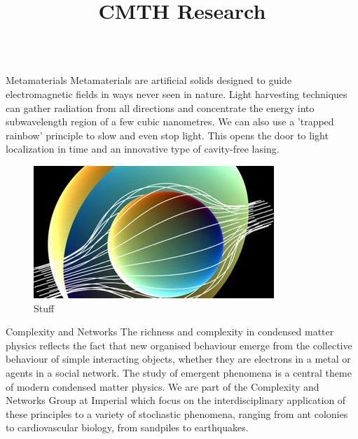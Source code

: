 \documentclass[xcolor={table}]{beamer}
\title{CMTH Research}
\begin{document}
\small
\begin{frame}[fragile=singleslide,t]\centering

\maketitle

\begin{columns}[onlytextwidth,T]

\begin{column}{.47\textwidth}

\begin{block}{Metamaterials}
Metamaterials are artificial solids designed to guide electromagnetic fields in
ways never seen in nature. Light harvesting techniques can gather radiation from
all directions and concentrate the energy into subwavelength region of a few
cubic nanometres. We can also use a 'trapped rainbow' principle to slow and even
stop light. This opens the door to light localization in time and an innovative
type of cavity-free lasing. 
\end{block}

\begin{figure}
    \includegraphics[width=\columnwidth, height=0.15\textheight]{metamaterials.jpg}
    \caption{\footnotesize Stuff}
\end{figure}

\begin{block}{Complexity and Networks}
The richness and complexity in condensed matter physics reflects the
fact that new organised behaviour emerge from the collective behaviour of simple
interacting objects, whether they are electrons in a metal or agents in a social
network. The study of emergent phenomena is a central theme of modern condensed
matter physics. We are part of the Complexity and Networks Group at Imperial
which focus on the interdisciplinary application of these principles to a
variety of stochastic phenomena, ranging from ant colonies to cardiovascular
biology, from sandpiles to earthquakes.
\end{block}


\end{column}
\end{columns}
\end{frame}
\end{document}
